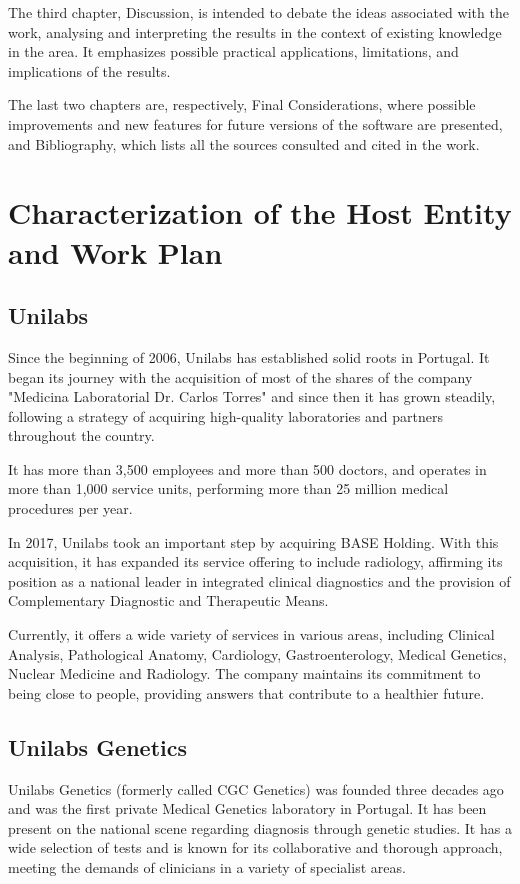 The third chapter, Discussion, is intended to debate the ideas associated with the work, analysing and interpreting the results in the context of existing knowledge in the area. It emphasizes possible practical applications, limitations, and implications of the results. 

The last two chapters are, respectively, Final Considerations, where possible improvements and new features for future versions of the software are presented, and Bibliography, which lists all the sources consulted and cited in the work.

\section{Characterization of the Host Entity and Work Plan}
\subsection{Unilabs}

Since the beginning of 2006, Unilabs has established solid roots in Portugal. It began its journey with the acquisition of most of the shares of the company "Medicina Laboratorial Dr. Carlos Torres" and since then it has grown steadily, following a strategy of acquiring high-quality laboratories and partners throughout the country. 

It has more than 3,500 employees and more than 500 doctors, and operates in more than 1,000 service units, performing more than 25 million medical procedures per year. 

In 2017, Unilabs took an important step by acquiring BASE Holding. With this acquisition, it has expanded its service offering to include radiology, affirming its position as a national leader in integrated clinical diagnostics and the provision of Complementary Diagnostic and Therapeutic Means. 

Currently, it offers a wide variety of services in various areas, including Clinical Analysis, Pathological Anatomy, Cardiology, Gastroenterology, Medical Genetics, Nuclear Medicine and Radiology. The company maintains its commitment to being close to people, providing answers that contribute to a healthier future. \cite{unilabs_sobre}

\subsection{Unilabs Genetics}
Unilabs Genetics (formerly called CGC Genetics) was founded three decades ago and was the first private Medical Genetics laboratory in Portugal. It has been present on the national scene regarding diagnosis through genetic studies. It has a wide selection of tests and is known for its collaborative and thorough approach, meeting the demands of clinicians in a variety of specialist areas. 

